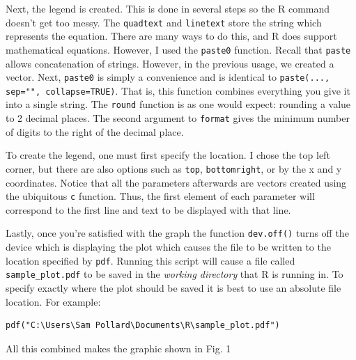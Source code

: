 \documentclass[12pt]{article}
\begin{document}
Next, the legend is created. This is done in several steps so the R command doesn't get too messy. The \verb|quadtext| and \verb|linetext| store the string which represents the equation. There are many ways to do this, and R does support mathematical equations. However, I used the \verb|paste0| function. Recall that \verb|paste| allows concatenation of strings. However, in the previous usage, we created a vector. Next, \verb|paste0| is simply a convenience and is identical to \verb|paste(..., sep="", collapse=TRUE)|. That is, this function combines everything you give it into a single string. The \verb|round| function is as one would expect: rounding a value to 2 decimal places. The second argument to \verb|format| gives the minimum number of digits to the right of the decimal place.

To create the legend, one must first specify the location. I chose the top left corner, but there are also options such as \verb|top|, \verb|bottomright|, or by the x and y coordinates. Notice that all the parameters afterwards are vectors created using the ubiquitous \verb|c| function. Thus, the first element of each parameter will correspond to the first line and text to be displayed with that line.

Lastly, once you're satisfied with the graph the function \verb|dev.off()| turns off the device which is displaying the plot which causes the file to be written to the location specified by \verb|pdf|. Running this script will cause a file called \verb|sample_plot.pdf| to be saved in the \emph{working directory} that R is running in. To specify exactly where the plot should be saved it is best to use an absolute file location. For example:
\begin{verbatim}
pdf("C:\Users\Sam Pollard\Documents\R\sample_plot.pdf")
\end{verbatim}
All this combined makes the graphic shown in Fig. 1 
\end{document}
